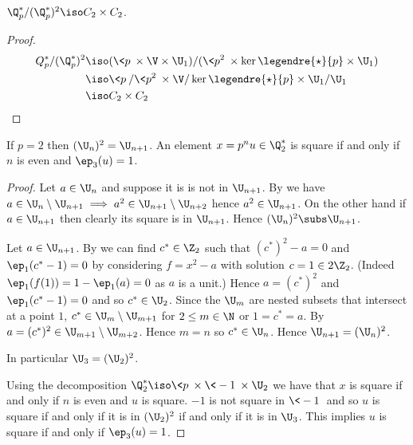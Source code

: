 \begin{cor}
    $\Q_p^* / (\Q_p^*)^2 \iso C_2 \times C_2$.
\end{cor}
\begin{proof}
    \begin{align*}
        Q_p^* / (\Q_p^*)^2 &\iso 
    (\<p\> \times \V \times \U_1)/
    (\<p^2\> \times \ker\legendre{\star}{p} \times \U_1)\\
    &\iso \<p\> /\<p^2\> \times \V / \ker\legendre{\star}{p} 
    \times \U_1 / \U_1 \\
    &\iso  C_2 \times C_2
    \end{align*}
\end{proof}

\begin{prop}
    If $p = 2$ then $(\U_n)^2 = \U_{n+1}$.
    An element $x = p^n u \in \Q_2^*$ is square if and only if
    $n$ is even and $\ep_3(u) = 1$.
\end{prop}
\begin{proof}
    Let $a \in \U_n$ and suppose it is is not in $\U_{n+1}$. 
    By 
    we have 
    $a\in \U_{n} \setminus \U_{n+1} \implies 
    a^2 \in \U_{n+1} \setminus \U_{n+2}$
    hence $a^2 \in \U_{n+1}$.
    On the other hand if $a \in \U_{n+1}$ 
    then clearly its square is in $\U_{n+1}$.
    Hence $(\U_n)^2 \subs \U_{n+1}$.

    Let $a \in \U_{n+1}$.
    By  we can find 
    $c^* \in \Z_2$ such that $(c^*)^2 - a = 0$
    and $\ep_1(c^* - 1) = 0$
    by considering $f = x^2 - a$ with solution 
    $c = 1 \in 2 \Z_2$. 
    (Indeed $\ep_1(f(1)) = 1 - \ep_1(a) = 0$ as $a$ is a unit.)
    Hence $a = (c^*)^2$ and 
    $\ep_1(c^* - 1) = 0$ and so $c^* \in \U_2$.
    Since the $\U_m$ are nested subsets that intersect at a point $1$,
    $c^* \in \U_m \setminus \U_{m+1}$
    for $2 \le m \in \N$ or $1 = c^* = a$.
    By 
    $a = (c^*)^2 \in \U_{m+1} \setminus \U_{m+2}$.
    Hence $m = n$ so $c^* \in \U_n$.
    Hence $\U_{n+1} = (\U_n)^2$.

    In particular $\U_{3} = (\U_2)^2$.

    Using the decomposition 
    $\Q_2^* \iso \<p\> \times \<-1\> \times \U_2$
    we have that $x$ is square if and only if 
    $n$ is even and $u$ is square.
    $-1$ is not square in $\<-1\>$ and so $u$ 
    is square if and only if it is in $(\U_2)^2$
    if and only if it is in $\U_3$.
    This implies $u$ is square 
    if and only if $\ep_3(u) = 1$.
\end{proof}

